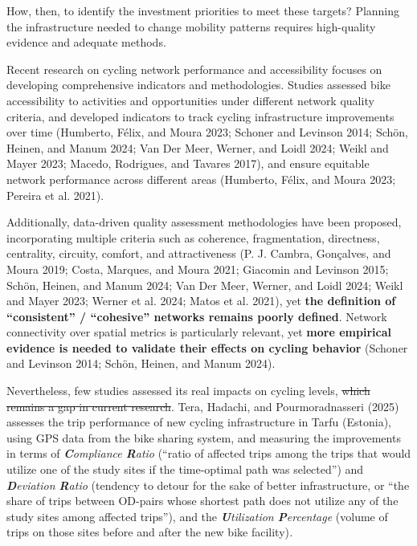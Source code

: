 \documentclass[
  sn-nature,
]{sn-jnl}
\begin{document}
How, then, to identify the investment priorities to meet these targets?
Planning the infrastructure needed to change mobility patterns requires
high-quality evidence and adequate methods.

Recent research on cycling network performance and accessibility focuses
on developing comprehensive indicators and methodologies. Studies
assessed bike accessibility to activities and opportunities under
different network quality criteria, and developed indicators to track
cycling infrastructure improvements over time (Humberto, Félix, and
Moura 2023; Schoner and Levinson 2014; Schön, Heinen, and Manum 2024;
Van Der Meer, Werner, and Loidl 2024; Weikl and Mayer 2023; Macedo,
Rodrigues, and Tavares 2017), and ensure equitable network performance
across different areas (Humberto, Félix, and Moura 2023; Pereira et al.
2021).

Additionally, data-driven quality assessment methodologies have been
proposed, incorporating multiple criteria such as coherence,
fragmentation, directness, centrality, circuity, comfort, and
attractiveness (P. J. Cambra, Gonçalves, and Moura 2019; Costa, Marques,
and Moura 2021; Giacomin and Levinson 2015; Schön, Heinen, and Manum
2024; Van Der Meer, Werner, and Loidl 2024; Weikl and Mayer 2023; Werner
et al. 2024; Matos et al. 2021), yet \textbf{the definition of
``consistent'' / ``cohesive'' networks remains poorly defined}. Network
connectivity over spatial metrics is particularly relevant, yet
\textbf{more empirical evidence is needed to validate their effects on
cycling behavior} (Schoner and Levinson 2014; Schön, Heinen, and Manum
2024).

Nevertheless, few studies assessed its real impacts on cycling levels,
\st{which remains a gap in current research}. Tera, Hadachi, and
Pourmoradnasseri (2025) assesses the trip performance of new cycling
infrastructure in Tarfu (Estonia), using GPS data from the bike sharing
system, and measuring the improvements in terms of
\emph{\textbf{C}ompliance \textbf{R}atio} (``ratio of affected trips
among the trips that would utilize one of the study sites if the
time-optimal path was selected'') and \emph{\textbf{D}eviation
\textbf{R}atio} (tendency to detour for the sake of better
infrastructure, or ``the share of trips between OD-pairs whose shortest
path does not utilize any of the study sites among affected trips''),
and the \emph{\textbf{U}tilization \textbf{P}ercentage} (volume of trips
on those sites before and after the new bike facility)\emph{.}
\end{document}

